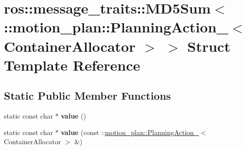 \hypertarget{structros_1_1message__traits_1_1MD5Sum_3_01_1_1motion__plan_1_1PlanningAction___3_01ContainerAllocator_01_4_01_4}{}\section{ros\+:\+:message\+\_\+traits\+:\+:M\+D5\+Sum$<$ \+:\+:motion\+\_\+plan\+:\+:Planning\+Action\+\_\+$<$ Container\+Allocator $>$ $>$ Struct Template Reference}
\label{structros_1_1message__traits_1_1MD5Sum_3_01_1_1motion__plan_1_1PlanningAction___3_01ContainerAllocator_01_4_01_4}
\subsection*{Static Public Member Functions}
\begin{DoxyCompactItemize}
\item 
\mbox{\label{structros_1_1message__traits_1_1MD5Sum_3_01_1_1motion__plan_1_1PlanningAction___3_01ContainerAllocator_01_4_01_4_adebfe1baa66eb2b21d221e7938028735}} 
static const char $\ast$ {\bfseries value} ()
\item 
\mbox{\label{structros_1_1message__traits_1_1MD5Sum_3_01_1_1motion__plan_1_1PlanningAction___3_01ContainerAllocator_01_4_01_4_a838a75f35bb1048030279e0b13c55859}} 
static const char $\ast$ {\bfseries value} (const \+::\hyperlink{structmotion__plan_1_1PlanningAction__}{motion\+\_\+plan\+::\+Planning\+Action\+\_\+}$<$ Container\+Allocator $>$ \&)
\end{DoxyCompactItemize}
